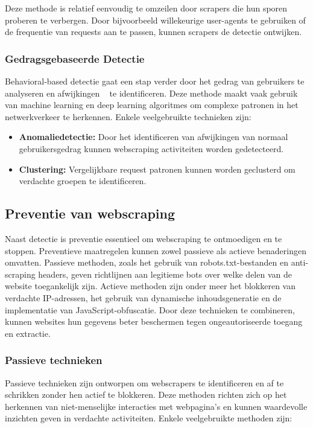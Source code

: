 Deze methode is relatief eenvoudig te omzeilen door scrapers die hun sporen proberen te verbergen. Door bijvoorbeeld willekeurige user-agents te gebruiken of de frequentie van requests aan te passen, kunnen scrapers de detectie ontwijken.

\subsubsection{Gedragsgebaseerde Detectie}
Behavioral-based detectie gaat een stap verder door het gedrag van gebruikers te analyseren en afwijkingen ~\autocite{Lotfi2021} te identificeren. Deze methode maakt vaak gebruik van machine learning en deep learning algoritmes om complexe patronen in het netwerkverkeer te herkennen. Enkele veelgebruikte technieken zijn:
\begin{itemize}
    \item \textbf{Anomaliedetectie: } Door het identificeren van afwijkingen van normaal gebruikersgedrag kunnen webscraping activiteiten worden gedetecteerd.
    \item \textbf{Clustering: }Vergelijkbare request patronen kunnen worden geclusterd om verdachte groepen te identificeren.
\end{itemize}


\subsection{Preventie van webscraping}
Naast detectie is preventie essentieel om webscraping te ontmoedigen en te stoppen. Preventieve maatregelen kunnen zowel passieve als actieve benaderingen omvatten. Passieve methoden, zoals het gebruik van robots.txt-bestanden en anti-scraping headers, geven richtlijnen aan legitieme bots over welke delen van de website toegankelijk zijn. Actieve methoden zijn onder meer het blokkeren van verdachte IP-adressen, het gebruik van dynamische inhoudsgeneratie en de implementatie van JavaScript-obfuscatie. Door deze technieken te combineren, kunnen websites hun gegevens beter beschermen tegen ongeautoriseerde toegang en extractie.

\subsubsection{Passieve technieken}
Passieve technieken zijn ontworpen om webscrapers te identificeren en af te schrikken zonder hen actief te blokkeren. Deze methoden richten zich op het herkennen van niet-menselijke interacties met webpagina's en kunnen waardevolle inzichten geven in verdachte activiteiten. Enkele veelgebruikte methoden zijn:

